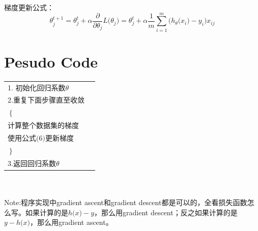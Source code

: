 \documentclass{ctexart}
\begin{document}
\begin{description}
梯度更新公式：
\begin{equation}
\theta_j^{t+1}=\theta_j^t+\alpha\frac{\partial}{\partial \theta_j}L\big(\theta_j\big)=\theta_j^t+\alpha\frac{1}{m}\sum_{i=1}^{m}\big(h_\theta\big(x_i\big)-y_i\big)x_{ij}
\end{equation}

\end{description} 

 

\section{Pesudo Code}

\begin{tabular}{ll}
1. 初始化回归系数$\theta$\\
2.重复下面步骤直至收敛\\
\quad$ \left\{ \right.$ \\
\quad \quad 计算整个数据集的梯度\\
\quad \quad 使用公式$\big(6\big)$更新梯度\\
\quad $\left. \right\}$ \\
3.返回回归系数$\theta$

\end{tabular}
\\
\\
Note:程序实现中gradient ascent和gradient descent都是可以的，全看损失函数怎么写。如果计算的是$h\big(x\big)-y$，那么用gradient descent；反之如果计算的是$y-h\big(x\big)$，那么用gradient ascent。
%
\end{document}
